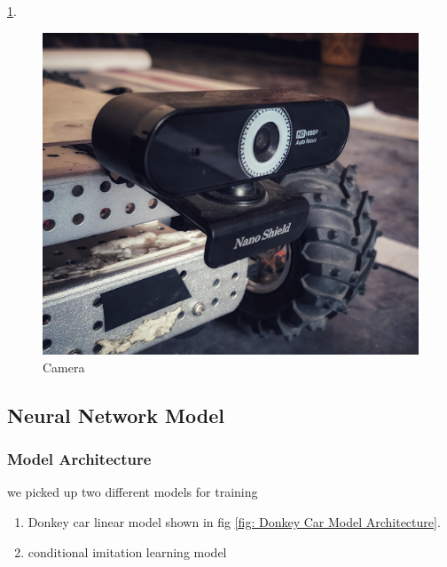 \ref{fig: Camera}.
\begin{figure}%
    \center%
    \includegraphics[width=.2\textwidth]{images/Learningprocess/small.png}%
    \caption[Camera]{Camera}\label{fig: Camera}%
 \end{figure}
\subsection{Neural Network Model}

\subsubsection{Model Architecture}
\hspace{2cm}we picked up two different models for training
    \begin{enumerate}
        \item Donkey car linear model shown in fig \ref{fig: Donkey Car Model Architecture}.
         \item conditional imitation learning model
    \end{enumerate}

